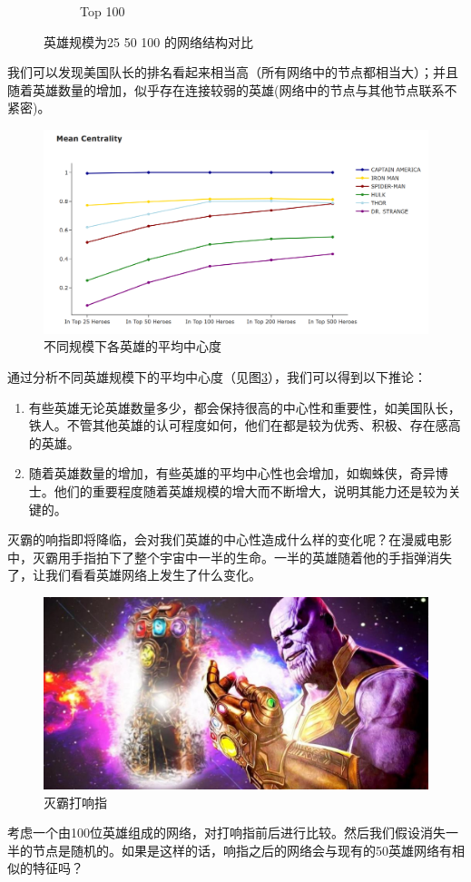 \documentclass[12pt]{xjtureport}
\begin{document}
\begin{figure}[htbp]
\begin{subfigure}[b]{0.3\textwidth}
      \caption{Top 100}
      \label{fig:sub3}
    \end{subfigure}
    \caption{英雄规模为25 50 100 的网络结构对比}
    \label{fig:combined}
  \end{figure}

我们可以发现美国队长的排名看起来相当高（所有网络中的节点都相当大）；并且随着英雄数量的增加，似乎存在连接较弱的英雄(网络中的节点与其他节点联系不紧密)。

\begin{figure}[!htbp]
    \centering
    \includegraphics[width=\linewidth]{figures/不同英雄规模下的平均中心度.png}
    \caption{不同规模下各英雄的平均中心度}
    \label{central_mean_nums}
\end{figure}

通过分析不同英雄规模下的平均中心度（见图\ref{central_mean_nums}），我们可以得到以下推论：

\begin{enumerate}
    \item 有些英雄无论英雄数量多少，都会保持很高的中心性和重要性，如美国队长，铁人。不管其他英雄的认可程度如何，他们在都是较为优秀、积极、存在感高的英雄。

    \item 随着英雄数量的增加，有些英雄的平均中心性也会增加，如蜘蛛侠，奇异博士。他们的重要程度随着英雄规模的增大而不断增大，说明其能力还是较为关键的。
\end{enumerate}

灭霸的响指即将降临，会对我们英雄的中心性造成什么样的变化呢？在漫威电影中，灭霸用手指拍下了整个宇宙中一半的生命。一半的英雄随着他的手指弹消失了，让我们看看英雄网络上发生了什么变化。
\begin{figure}[b]
    \centering
    \includegraphics[width=0.7\linewidth]{figures/灭霸打响指.jpeg}
    \caption{灭霸打响指}
    \label{dimo}
\end{figure}
考虑一个由100位英雄组成的网络，对打响指前后进行比较。然后我们假设消失一半的节点是随机的。如果是这样的话，响指之后的网络会与现有的50英雄网络有相似的特征吗？
\end{document}
